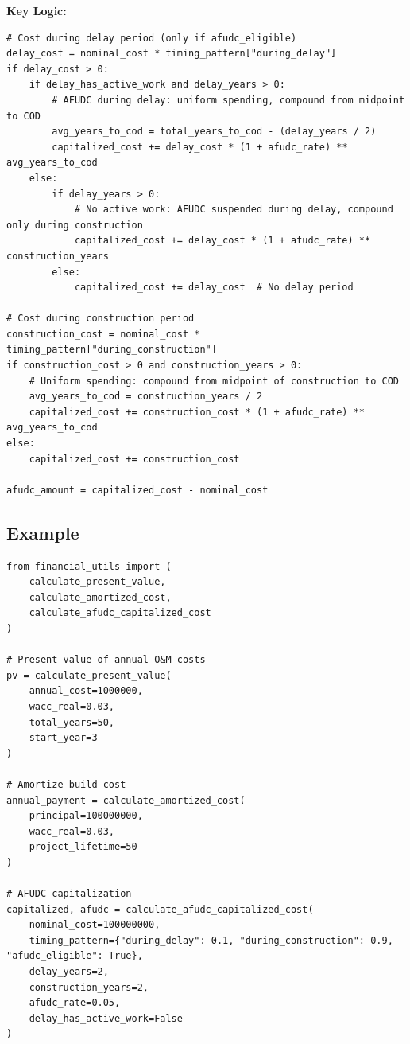 \documentclass[ctcc_full_documentation.tex]{subfiles}
\begin{document}
\textbf{Key Logic:}
\begin{lstlisting}
# Cost during delay period (only if afudc_eligible)
delay_cost = nominal_cost * timing_pattern["during_delay"]
if delay_cost > 0:
    if delay_has_active_work and delay_years > 0:
        # AFUDC during delay: uniform spending, compound from midpoint to COD
        avg_years_to_cod = total_years_to_cod - (delay_years / 2)
        capitalized_cost += delay_cost * (1 + afudc_rate) ** avg_years_to_cod
    else:
        if delay_years > 0:
            # No active work: AFUDC suspended during delay, compound only during construction
            capitalized_cost += delay_cost * (1 + afudc_rate) ** construction_years
        else:
            capitalized_cost += delay_cost  # No delay period

# Cost during construction period
construction_cost = nominal_cost * timing_pattern["during_construction"]
if construction_cost > 0 and construction_years > 0:
    # Uniform spending: compound from midpoint of construction to COD
    avg_years_to_cod = construction_years / 2
    capitalized_cost += construction_cost * (1 + afudc_rate) ** avg_years_to_cod
else:
    capitalized_cost += construction_cost

afudc_amount = capitalized_cost - nominal_cost
\end{lstlisting}

\subsection{Example}

\begin{lstlisting}
from financial_utils import (
    calculate_present_value,
    calculate_amortized_cost,
    calculate_afudc_capitalized_cost
)

# Present value of annual O&M costs
pv = calculate_present_value(
    annual_cost=1000000,
    wacc_real=0.03,
    total_years=50,
    start_year=3
)

# Amortize build cost
annual_payment = calculate_amortized_cost(
    principal=100000000,
    wacc_real=0.03,
    project_lifetime=50
)

# AFUDC capitalization
capitalized, afudc = calculate_afudc_capitalized_cost(
    nominal_cost=100000000,
    timing_pattern={"during_delay": 0.1, "during_construction": 0.9, "afudc_eligible": True},
    delay_years=2,
    construction_years=2,
    afudc_rate=0.05,
    delay_has_active_work=False
)
\end{lstlisting}
\end{document}
